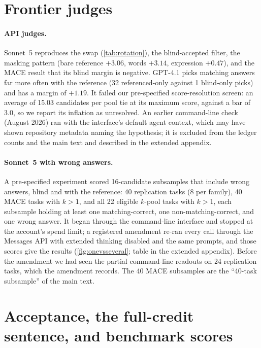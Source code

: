 \FloatBarrier
\section{Frontier judges}
\label{app:frontier}

\paragraph{API judges.}
Sonnet~5 reproduces the swap (\cref{tab:rotation}), the blind-accepted filter, the masking pattern (bare reference $+3.06$, words $+3.14$, expression $+0.47$), and the \textsc{MACE} result that its blind margin is negative. GPT-4.1 picks matching answers far more often with the reference (32 referenced-only against 1 blind-only picks) and has a margin of $+1.19$. It failed our pre-specified score-resolution screen: an average of 15.03 candidates per pool tie at its maximum score, against a bar of 3.0, so we report its inflation as unresolved. An earlier command-line check (August 2026) ran with the interface's default agent context, which may have shown repository metadata naming the hypothesis; it is excluded from the ledger counts and the main text and described in the extended appendix.

\paragraph{Sonnet~5 with wrong answers.}
A pre-specified experiment scored 16-candidate subsamples that include wrong answers, blind and with the reference: 40 replication tasks (8 per family), 40 \textsc{MACE} tasks with $k{>}1$, and all 22 eligible $k$-pool tasks with $k{>}1$, each subsample holding at least one matching-correct, one non-matching-correct, and one wrong answer. It began through the command-line interface and stopped at the account's spend limit; a registered amendment re-ran every call through the Messages API with extended thinking disabled and the same prompts, and those scores give the results (\cref{fig:onevsseveral}; table in the extended appendix).\pre{} Before the amendment we had seen the partial command-line readouts on 24 replication tasks, which the amendment records. The 40 \textsc{MACE} subsamples are the ``40-task subsample'' of the main text.

\FloatBarrier
\section{Acceptance, the full-credit sentence, and benchmark scores}
\label{app:acceptance}

